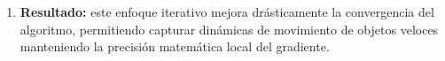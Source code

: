 \begin{enumerate}
    \item \textbf{Resultado:} este enfoque iterativo mejora drásticamente la convergencia del algoritmo, permitiendo capturar dinámicas de movimiento de objetos veloces manteniendo la precisión matemática local del gradiente.
\end{enumerate}

